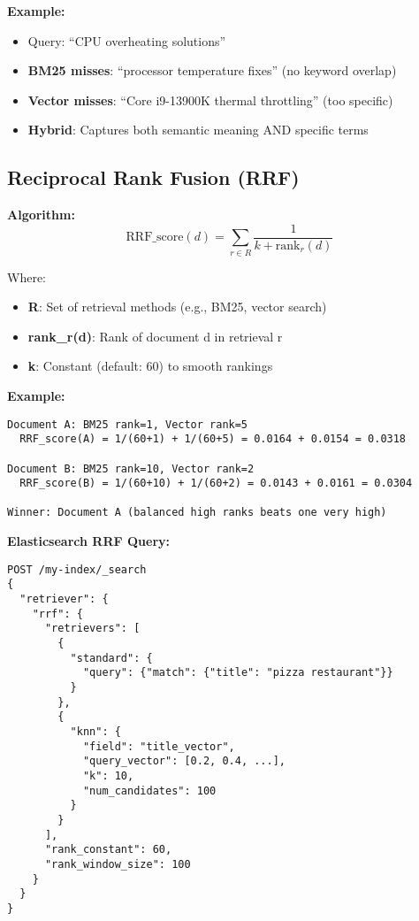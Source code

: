 \documentclass[10pt]{article}
\begin{document}
\textbf{Example:}
\begin{itemize}
\item Query: ``CPU overheating solutions''
\item \textbf{BM25 misses}: ``processor temperature fixes'' (no keyword overlap)
\item \textbf{Vector misses}: ``Core i9-13900K thermal throttling'' (too specific)
\item \textbf{Hybrid}: Captures both semantic meaning AND specific terms
\end{itemize}

\subsection{Reciprocal Rank Fusion (RRF)}

\textbf{Algorithm:}
\[
\text{RRF\_score}(d) = \sum_{r \in R} \frac{1}{k + \text{rank}_r(d)}
\]

Where:
\begin{itemize}
\item \textbf{R}: Set of retrieval methods (e.g., BM25, vector search)
\item \textbf{rank\_r(d)}: Rank of document d in retrieval r
\item \textbf{k}: Constant (default: 60) to smooth rankings
\end{itemize}

\textbf{Example:}
\begin{verbatim}
Document A: BM25 rank=1, Vector rank=5
  RRF_score(A) = 1/(60+1) + 1/(60+5) = 0.0164 + 0.0154 = 0.0318

Document B: BM25 rank=10, Vector rank=2
  RRF_score(B) = 1/(60+10) + 1/(60+2) = 0.0143 + 0.0161 = 0.0304

Winner: Document A (balanced high ranks beats one very high)
\end{verbatim}

\textbf{Elasticsearch RRF Query:}
\begin{lstlisting}
POST /my-index/_search
{
  "retriever": {
    "rrf": {
      "retrievers": [
        {
          "standard": {
            "query": {"match": {"title": "pizza restaurant"}}
          }
        },
        {
          "knn": {
            "field": "title_vector",
            "query_vector": [0.2, 0.4, ...],
            "k": 10,
            "num_candidates": 100
          }
        }
      ],
      "rank_constant": 60,
      "rank_window_size": 100
    }
  }
}
\end{lstlisting}
\end{document}
